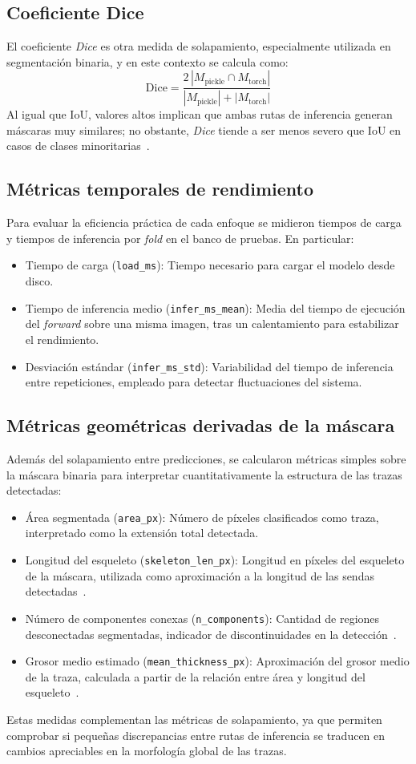 \subsection{Coeficiente Dice}
El coeficiente \textit{Dice} es otra medida de solapamiento, especialmente utilizada en segmentación binaria, y en este contexto se calcula como:
\begin{equation}
	\mathrm{Dice} = \frac{2\,|M_{\text{pickle}} \cap M_{\text{torch}}|}{|M_{\text{pickle}}| + |M_{\text{torch}}|}
\end{equation}
Al igual que IoU, valores altos implican que ambas rutas de inferencia generan máscaras muy similares; no obstante, \textit{Dice} tiende a ser menos severo que IoU en casos de clases minoritarias~\cite{TahaHanbury2015,minaee2022segmentationSurvey}.

\subsection{Métricas temporales de rendimiento}
Para evaluar la eficiencia práctica de cada enfoque se midieron tiempos de carga y tiempos de inferencia por \textit{fold} en el banco de pruebas. En particular:
\begin{itemize}
	\item Tiempo de carga (\texttt{load\_ms}): Tiempo necesario para cargar el modelo desde disco.
	\item Tiempo de inferencia medio (\texttt{infer\_ms\_mean}): Media del tiempo de ejecución del \textit{forward} sobre una misma imagen, tras un calentamiento para estabilizar el rendimiento.
	\item Desviación estándar (\texttt{infer\_ms\_std}): Variabilidad del tiempo de inferencia entre repeticiones, empleado para detectar fluctuaciones del sistema.
\end{itemize}

\subsection{Métricas geométricas derivadas de la máscara}
Además del solapamiento entre predicciones, se calcularon métricas simples sobre la máscara binaria para interpretar cuantitativamente la estructura de las trazas detectadas:
\begin{itemize}
	\item Área segmentada (\texttt{area\_px}): Número de píxeles clasificados como traza, interpretado como la extensión total detectada.
	\item Longitud del esqueleto (\texttt{skeleton\_len\_px}): Longitud en píxeles del esqueleto de la máscara, utilizada como aproximación a la longitud de las sendas detectadas~\cite{zhang1984thinning}.
	\item Número de componentes conexas (\texttt{n\_components}): Cantidad de regiones desconectadas segmentadas, indicador de discontinuidades en la detección~\cite{gonzalez2008dip}.
	\item Grosor medio estimado (\texttt{mean\_thickness\_px}): Aproximación del grosor medio de la traza, calculada a partir de la relación entre área y longitud del esqueleto~\cite{zhang1984thinning}.
\end{itemize}

Estas medidas complementan las métricas de solapamiento, ya que permiten comprobar si pequeñas discrepancias entre rutas de inferencia se traducen en cambios apreciables en la morfología global de las trazas.




